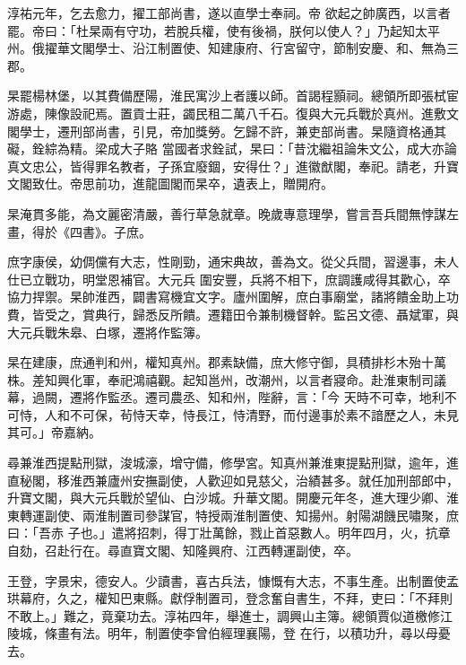 \begin{pinyinscope}
 淳祐元年，乞去愈力，擢工部尚書，遂以直學士奉祠。帝
 欲起之帥廣西，以言者罷。帝曰：「杜杲兩有守功，若脫兵權，使有後禍，朕何以使人？」乃起知太平州。俄擢華文閣學士、沿江制置使、知建康府、行宮留守，節制安慶、和、無為三郡。



 杲罷楊林堡，以其費備歷陽，淮民寓沙上者護以師。首謁程顥祠。總領所即張栻宦游處，陳像設祀焉。置貢士莊，蠲民租二萬八千石。復與大元兵戰於真州。進敷文閣學士，遷刑部尚書，引見，帝加獎勞。乞歸不許，兼吏部尚書。杲隨資格通其礙，銓綜為精。梁成大子賂
 當國者求銓試，杲曰：「昔沈繼祖論朱文公，成大亦論真文忠公，皆得罪名教者，子孫宜廢錮，安得仕？」進徽猷閣，奉祀。請老，升寶文閣致仕。帝思前功，進龍圖閣而杲卒，遺表上，贈開府。



 杲淹貫多能，為文麗密清嚴，善行草急就章。晚歲專意理學，嘗言吾兵間無悖謀左畫，得於《四書》。子庶。



 庶字康侯，幼倜儻有大志，性剛勁，通宋典故，善為文。從父兵間，習邊事，未人仕已立戰功，明堂恩補官。大元兵
 圍安豐，兵將不相下，庶調護咸得其歡心，卒協力捍禦。杲帥淮西，闢書寫機宜文字。廬州圍解，庶白事廟堂，諸將饋金助上功費，皆受之，賞典行，歸悉反所饋。遷籍田令兼制機督幹。監呂文德、聶斌軍，與大元兵戰朱皋、白塚，遷將作監簿。



 杲在建康，庶通判和州，權知真州。郡素缺備，庶大修守御，具積排杉木殆十萬株。差知興化軍，奉祀鴻禧觀。起知邕州，改潮州，以言者寢命。赴淮東制司議幕，過闕，遷將作監丞。遷司農丞、知和州，陛辭，言：「今
 天時不可幸，地利不可恃，人和不可保，茍恃天幸，恃長江，恃清野，而付邊事於素不諳歷之人，未見其可。」帝嘉納。



 尋兼淮西提點刑獄，浚城濠，增守備，修學宮。知真州兼淮東提點刑獄，逾年，進直秘閣，移淮西兼廬州安撫副使，人歡迎如見慈父，治績甚多。就任加刑部郎中，升寶文閣，與大元兵戰於望仙、白沙城。升華文閣。開慶元年冬，進大理少卿、淮東轉運副使、兩淮制置司參謀官，特授兩淮制置使、知揚州。射陽湖饑民嘯聚，庶曰：「吾赤
 子也。」遣將招刺，得丁壯萬餘，戮止首惡數人。明年四月，火，抗章自劾，召赴行在。尋直寶文閣、知隆興府、江西轉運副使，卒。



 王登，字景宋，德安人。少讀書，喜古兵法，慷慨有大志，不事生產。出制置使孟珙幕府，久之，權知巴東縣。獻俘制置司，登念奮自書生，不拜，吏曰：「不拜則不敢上。」難之，竟棄功去。淳祐四年，舉進士，調興山主簿。總領賈似道檄修江陵城，條畫有法。明年，制置使李曾伯經理襄陽，登
 在行，以積功升，尋以母憂去。




\end{pinyinscope}
